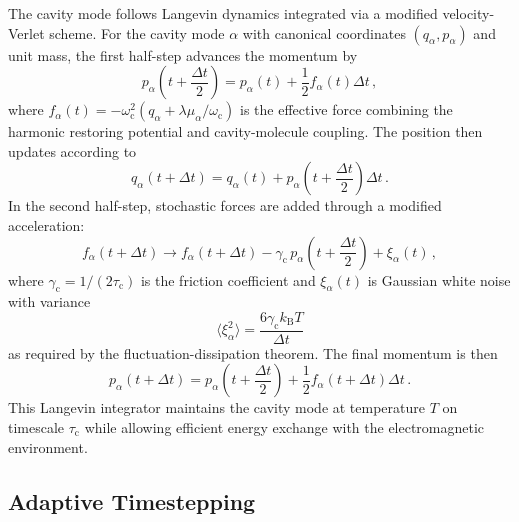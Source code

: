 \documentclass[%
 reprint,
 amsmath,amssymb,
 aps,
]{revtex4-2}
\begin{document}
The cavity mode follows Langevin dynamics integrated via a modified velocity-Verlet scheme.
For the cavity mode $\alpha$ with canonical coordinates $(q_\alpha, p_\alpha)$ and unit mass, the first half-step advances the momentum by
\begin{equation}
p_\alpha\left(t + \frac{\Delta t}{2}\right) = p_\alpha(t) + \frac{1}{2} f_\alpha(t) \Delta t \,,
\end{equation}
where $f_\alpha(t) = -\omega_\mathrm{c}^2(q_\alpha + \lambda \mu_\alpha / \omega_\mathrm{c})$ is the effective force combining the harmonic restoring potential and cavity-molecule coupling.
The position then updates according to
\begin{equation}
q_\alpha(t + \Delta t) = q_\alpha(t) + p_\alpha\left(t + \frac{\Delta t}{2}\right) \Delta t \,.
\end{equation}
In the second half-step, stochastic forces are added through a modified acceleration:
\begin{equation}
f_\alpha(t + \Delta t) \to f_\alpha(t + \Delta t) - \gamma_\mathrm{c} \, p_\alpha\left(t + \frac{\Delta t}{2}\right) + \xi_\alpha(t) \,,
\end{equation}
where $\gamma_\mathrm{c} = 1/(2\tau_\mathrm{c})$ is the friction coefficient and $\xi_\alpha(t)$ is Gaussian white noise with variance
\begin{equation}
\langle \xi_\alpha^2 \rangle = \frac{6 \gamma_\mathrm{c} k_\mathrm{B} T}{\Delta t}
\end{equation}
as required by the fluctuation-dissipation theorem.
The final momentum is then
\begin{equation}
p_\alpha(t + \Delta t) = p_\alpha\left(t + \frac{\Delta t}{2}\right) + \frac{1}{2} f_\alpha(t + \Delta t) \Delta t \,.
\end{equation}
This Langevin integrator maintains the cavity mode at temperature $T$ on timescale $\tau_\mathrm{c}$ while allowing efficient energy exchange with the electromagnetic environment.

\subsection{Adaptive Timestepping}
\end{document}

